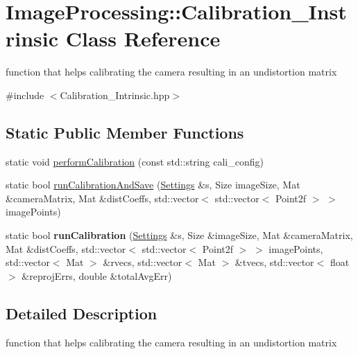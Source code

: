 \hypertarget{class_image_processing_1_1_calibration___instrinsic}{}\section{Image\+Processing\+:\+:Calibration\+\_\+\+Instrinsic Class Reference}
\label{class_image_processing_1_1_calibration___instrinsic}


function that helps calibrating the camera resulting in an undistortion matrix  




{\ttfamily \#include $<$Calibration\+\_\+\+Intrinsic.\+hpp$>$}

\subsection*{Static Public Member Functions}
\begin{DoxyCompactItemize}
\item 
static void \mbox{\hyperlink{class_image_processing_1_1_calibration___instrinsic_acbaa653aac61aa9fc42696a51267b6b8}{perform\+Calibration}} (const std\+::string cali\+\_\+config)
\item 
static bool \mbox{\hyperlink{class_image_processing_1_1_calibration___instrinsic_a69ec772ab65d6fc5918a39b5e5839e2e}{run\+Calibration\+And\+Save}} (\mbox{\hyperlink{class_image_processing_1_1_settings}{Settings}} \&s, Size image\+Size, Mat \&camera\+Matrix, Mat \&dist\+Coeffs, std\+::vector$<$ std\+::vector$<$ Point2f $>$ $>$ image\+Points)
\item 
\mbox{\label{class_image_processing_1_1_calibration___instrinsic_ad38f84410a98a93ed3c2078f06210880}} 
static bool {\bfseries run\+Calibration} (\mbox{\hyperlink{class_image_processing_1_1_settings}{Settings}} \&s, Size \&image\+Size, Mat \&camera\+Matrix, Mat \&dist\+Coeffs, std\+::vector$<$ std\+::vector$<$ Point2f $>$ $>$ image\+Points, std\+::vector$<$ Mat $>$ \&rvecs, std\+::vector$<$ Mat $>$ \&tvecs, std\+::vector$<$ float $>$ \&reproj\+Errs, double \&total\+Avg\+Err)
\end{DoxyCompactItemize}


\subsection{Detailed Description}
function that helps calibrating the camera resulting in an undistortion matrix 

